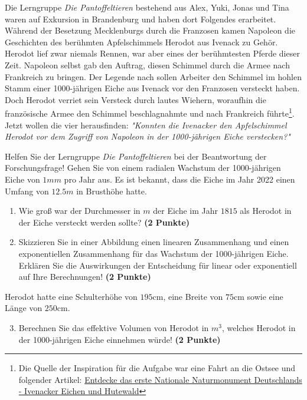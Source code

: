 \documentclass[a4paper, 9pt]{scrartcl}\usepackage[]{graphicx}\usepackage[]{xcolor}
\begin{document}
Die Lerngruppe \textit{Die Pantoffeltieren} bestehend aus Alex, Yuki, Jonas und Tina waren auf Exkursion in Brandenburg und haben dort Folgendes erarbeitet. Während der Besetzung Mecklenburgs durch die Franzosen kamen Napoleon die Geschichten des berühmten Apfelschimmels Herodot aus Ivenack zu Gehör. Herodot lief zwar niemals Rennen, war aber eines der berühmtesten Pferde dieser Zeit. Napoleon selbst gab den Auftrag, diesen Schimmel durch die Armee nach Frankreich zu bringen. Der Legende nach sollen Arbeiter den Schimmel im hohlen Stamm einer 1000-jährigen Eiche aus Ivenack vor den Franzosen versteckt haben. Doch Herodot verriet sein Versteck durch lautes Wiehern, woraufhin die französische Armee den Schimmel beschlagnahmte und nach Frankreich führte\footnote{Die Quelle der Inspiration  für die Aufgabe war eine Fahrt an die Ostsee und folgender Artikel:
  \href{https://www.wald-mv.de/landingpage/ivenacker-eichen/}{Entdecke das erste Nationale Naturmonument Deutschlands - Ivenacker Eichen und Hutewald}}. Jetzt wollen die vier herausfinden: \textit{"Konnten die Ivenacker den Apfelschimmel Herodot vor dem Zugriff von Napoleon in der 1000-jährigen Eiche verstecken?"} 



\vspace{1Ex}

Helfen Sie der Lerngruppe \textit{Die Pantoffeltieren} bei der Beantwortung der Forschungsfrage! Gehen Sie von einem radialen Wachstum der 1000-jährigen Eiche von $1mm$ pro Jahr aus. Es ist bekannt, dass die Eiche im Jahr 2022 einen Umfang von $12.5m$ in Brusthöhe hatte.

\begin{enumerate}
\item Wie groß war der Durchmesser in $m$ der Eiche im Jahr $1815$ als Herodot in der Eiche versteckt werden sollte? \textbf{(2 Punkte)}
\item Skizzieren Sie in einer Abbildung einen linearen Zusammenhang und einen exponentiellen Zusammenhang für das Wachstum der 1000-jährigen Eiche. Erklären Sie die Auswirkungen der Entscheidung für linear oder exponentiell auf Ihre Berechnungen! \textbf{(2 Punkte)}
\end{enumerate}
 
Herodot hatte eine Schulterhöhe von $195$cm, eine Breite von $75$cm sowie eine Länge von  $250$cm.

\begin{enumerate}
  \setcounter{enumi}{2}
\item Berechnen Sie das effektive Volumen von Herodot in $m^3$, welches Herodot in der 1000-jährigen Eiche einnehmen würde! \textbf{(2 Punkte)}
\end{enumerate}
\end{document}
